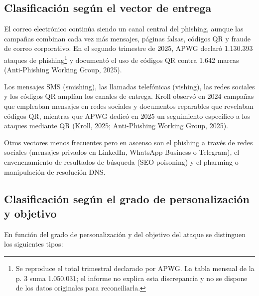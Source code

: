 \documentclass[11pt,a4paper,oneside]{report}
\begin{document}
\subsection{Clasificación según el vector de entrega}

El correo electrónico continúa siendo un canal central del phishing, aunque las campañas combinan cada vez más mensajes, páginas falsas, códigos QR y fraude de correo corporativo. En el segundo trimestre de 2025, APWG declaró 1.130.393 ataques de phishing\footnote{Se reproduce el total trimestral declarado por APWG. La tabla mensual de la p. 3 suma 1.050.031; el informe no explica esta discrepancia y no se dispone de los datos originales para reconciliarla.} y documentó el uso de códigos QR contra 1.642 marcas (Anti-Phishing Working Group, 2025).

Los mensajes SMS (smishing), las llamadas telefónicas (vishing), las redes sociales y los códigos QR amplían los canales de entrega. Kroll observó en 2024 campañas que empleaban mensajes en redes sociales y documentos reparables que revelaban códigos QR, mientras que APWG dedicó en 2025 un seguimiento específico a los ataques mediante QR (Kroll, 2025; Anti-Phishing Working Group, 2025).

Otros vectores menos frecuentes pero en ascenso son el phishing a través de redes sociales (mensajes privados en LinkedIn, WhatsApp Business o Telegram), el envenenamiento de resultados de búsqueda (SEO poisoning) y el pharming o manipulación de resolución DNS.

\subsection{Clasificación según el grado de personalización y objetivo}

En función del grado de personalización y del objetivo del ataque se distinguen los siguientes tipos:
\end{document}
